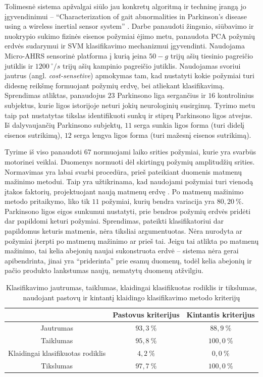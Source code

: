 \documentclass[]{vgtuef}
\begin{document}

Tolimesnė sistema apžvalgai siūlo jau konkretų algoritmą ir techninę įrangą jo įgyvendinimui -- ``Characterization of gait abnormalities in Parkinson's disease using a wireless inertial sensor system'' \cite{5627904}. Darbe panaudoti žingsnio, siūbavimo ir nuokrypio sukimo fizinės eisenos požymiai ėjimo metu, panaudota PCA požymių erdvės sudarymui ir SVM klasifikavimo mechanizmui įgyvendinti. Naudojama Micro-AHRS sensorinė platforma į kurią įeina $50-g$ trijų ašių tiesinio pagreičio jutiklis ir $1200~^\circ/s$ trijų ašių kampinio pagreičio jutiklis. Naudojamas svoriui jautrus (angl. \textit{cost-sensetive}) apmokymas tam, kad nustatyti kokie požymiai turi didesnę reikšmę formuojant požymių erdvę, bei atliekant klasifikavimą. Sprendimas atliktas, panaudojus $23$ Parkinsono liga sergančius ir $16$ kontrolinius subjektus, kurie ligos istorijoje neturi jokių neurologinių susirgimų. Tyrimo metu taip pat nustatytas tikslas identifikuoti sunkų ir stiprų Parkinsono ligos atvejus. Iš dalyvaujančių Parkinsono subjektų, $11$ serga sunkia ligos forma (turi didelį eisenos sutrikimą), $12$ serga lengva ligos forma (turi mažesnį eisenos sutrikimą). 

Tyrime iš viso panaudoti $67$ normuojami laiko srities požymiai, kurie yra svarbūs motorinei veiklai. Duomenys normuoti dėl skirtingų požymių amplitudžių srities. Normavimas yra labai svarbi procedūra, prieš pateikiant duomenis matmenų mažinimo metodui. Taip yra užtikrinama, kad naudojami požymiai turi vienodą įtakos faktorių, projektuojant naują matmenų erdvę \cite{824819}. Po matmenų mažinimo metodo pritaikymo, liko tik $11$ požymiai, kurių bendra variacija yra $80,20~\%$. Parkinsono ligos eigos sunkumui nustatyti, prie bendros požymių erdvės pridėti dar papildomi keturi požymiai. Sprendimas, pateikti klasifikatoriui dar papildomus keturis matmenis, nėra tiksliai argumentuotas. Nėra nurodyta ar požymiai įterpti po matmenų mažinimo ar prieš tai. Jeigu tai atlikta po matmenų mažinimo, tai kelia abejonių naujai sukonstruota erdvė -- sistema nėra gerai apibendrinta, jinai yra ``priderinta'' prie esamų duomenų, todėl kelia abejonių ir pačio produkto lankstumas naujų, nematytų duomenų atžvilgiu. 

\begin{table}
	\centering
  \renewcommand{\arraystretch}{1.3}
	\caption{Klasifikavimo jautrumas, taiklumas, klaidingai klasifikuotas rodiklis ir tikslumas, naudojant pastovų ir kintantį klaidingo klasifikavimo metodo kriterijų \cite{5627904}}
	\label{table:wireless_svm_pd_recognition}
	\begin{tabular}{|c|c|c|} \hline
		& Pastovus kriterijus & Kintantis kriterijus \\ \hline
	Jautrumas & $93,3~\%$ & $88,9~\%$ \\ \hline
	Taiklumas & $95,8~\%$ & $100,0~\%$ \\ \hline
	Klaidingai klasifikuotas rodiklis & $4,2~\%$ & $0,0~\%$ \\ \hline
	Tikslumas & $97,7~\%$ & $100,0~\%$ \\ \hline
	\end{tabular}
\end{table}
\end{document}
